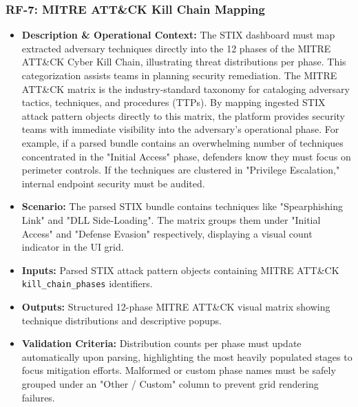 \subsubsection{RF-7: MITRE ATT\&CK Kill Chain Mapping}
\begin{itemize}
    \item \textbf{Description \& Operational Context:} The STIX dashboard must map extracted adversary techniques directly into the 12 phases of the MITRE ATT\&CK Cyber Kill Chain, illustrating threat distributions per phase. This categorization assists teams in planning security remediation. The MITRE ATT\&CK matrix is the industry-standard taxonomy for cataloging adversary tactics, techniques, and procedures (TTPs). By mapping ingested STIX attack pattern objects directly to this matrix, the platform provides security teams with immediate visibility into the adversary's operational phase. For example, if a parsed bundle contains an overwhelming number of techniques concentrated in the "Initial Access" phase, defenders know they must focus on perimeter controls. If the techniques are clustered in "Privilege Escalation," internal endpoint security must be audited.
    \item \textbf{Scenario:} The parsed STIX bundle contains techniques like "Spearphishing Link" and "DLL Side-Loading". The matrix groups them under "Initial Access" and "Defense Evasion" respectively, displaying a visual count indicator in the UI grid.
    \item \textbf{Inputs:} Parsed STIX attack pattern objects containing MITRE ATT\&CK \texttt{kill\_}\allowbreak\texttt{chain\_}\allowbreak\texttt{phases} identifiers.
    \item \textbf{Outputs:} Structured 12-phase MITRE ATT\&CK visual matrix showing technique distributions and descriptive popups.
    \item \textbf{Validation Criteria:} Distribution counts per phase must update automatically upon parsing, highlighting the most heavily populated stages to focus mitigation efforts. Malformed or custom phase names must be safely grouped under an "Other / Custom" column to prevent grid rendering failures.
\end{itemize}

